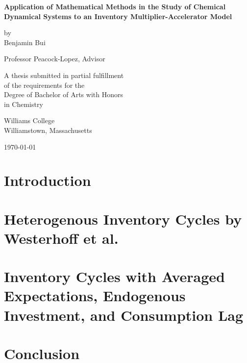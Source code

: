 \documentclass[12pt,twoside]{report}
\begin{document}
\begin{titlepage}
	\begin{center}
		\vspace*{1.5 cm}
		\textbf{Application of Mathematical Methods in the Study of Chemical Dynamical Systems to an Inventory Multiplier-Accelerator Model}


		\vspace{1.5 cm}

		by\\ Benjamin Bui
		\vspace{1.5 cm}

		Professor Peacock-Lopez, Advisor
		\vspace{1.5 cm}

		A thesis submitted in partial fulfillment\\
		of the requirements for the\\
		Degree of Bachelor of Arts with Honors\\
		in Chemistry
		\vspace{1.5 cm}

		Williams College\\
		Williamstown, Massachusetts
		\vspace{1.5 cm}

		\today
	\end{center}
\end{titlepage}




\tableofcontents
\chapter{Introduction}

\chapter{Heterogenous Inventory Cycles by Westerhoff et al.}

\chapter{Inventory Cycles with Averaged Expectations, Endogenous Investment, and Consumption Lag}

\chapter{Conclusion}

\end{document}
